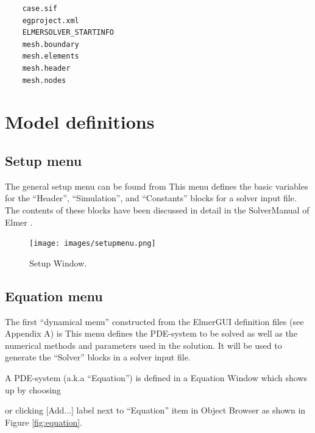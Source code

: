 \begin{footnotesize}
	\begin{verbatim}
	case.sif 
	egproject.xml
	ELMERSOLVER_STARTINFO 
	mesh.boundary 
	mesh.elements 
	mesh.header 
	mesh.nodes
	\end{verbatim}
\end{footnotesize}

\chapter{Model definitions}

\section{Setup menu}

The general setup menu can be found from
\noindent This menu defines the basic variables for the ``Header'', ``Simulation'',
and ``Constants'' blocks for a solver input file. The contents of these blocks have
been discussed in detail in the SolverManual of Elmer \cite{ElmerHome}.

\begin{figure}[htb]
\begin{center}
 \texttt{[image: images/setupmenu.png]}
\caption{Setup Window.}
\end{center}
\end{figure}

\section{Equation menu}

The first ``dynamical menu'' constructed from the ElmerGUI definition files (see Appendix A) is
\noindent This menu defines the PDE-system to be solved as well as the numerical
methods and parameters used in the solution. It will be used to generate the ``Solver''
blocks in a solver input file.

A PDE-system (a.k.a ``Equation'') is defined in a Equation Window which shows up by choosing

\noindent or clicking [Add...] label next to ``Equation'' item in Object Browser as shown in Figure \ref{fig:equation}.

